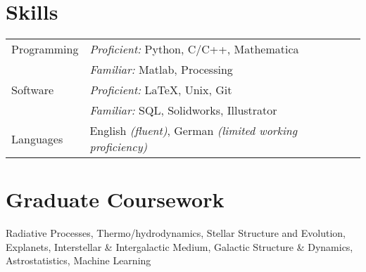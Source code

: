 \documentclass[margin,line]{resume}
\newcommand{\tab}[1]{\hspace{.2667\textwidth}\rlap{#1}}
\newcommand{\itab}[1]{\hspace{0em}\rlap{#1}}
\begin{document}
\begin{resume}
\section{\mysidestyle \textcolor{bcolor}{Skills}} 

\noindent\begin{tabular}{@{}l|l}
  \multirow{1}{*}{{\sc Programming}} & \textit{Proficient:} Python, C/C++, Mathematica \\
    & \textit{Familiar:} Matlab, Processing \vspace{.1cm} \\
  \multirow{1}{*}{{\sc Software}} & \textit{Proficient:} \LaTeX, Unix, Git \\
    & \textit{Familiar:} SQL, Solidworks, Illustrator  \vspace{.1cm} \\
  \multirow{1}{*}{{\sc Languages}} & English \textit{(fluent)}, German \textit{(limited working proficiency)}
\end{tabular}


\section{\mysidestyle \textcolor{bcolor}{Graduate Coursework}} 

Radiative Processes, Thermo/hydrodynamics, Stellar Structure and Evolution, Explanets, Interstellar \& Intergalactic Medium, Galactic Structure \& Dynamics, Astrostatistics, Machine Learning



\end{resume}
\end{document}
